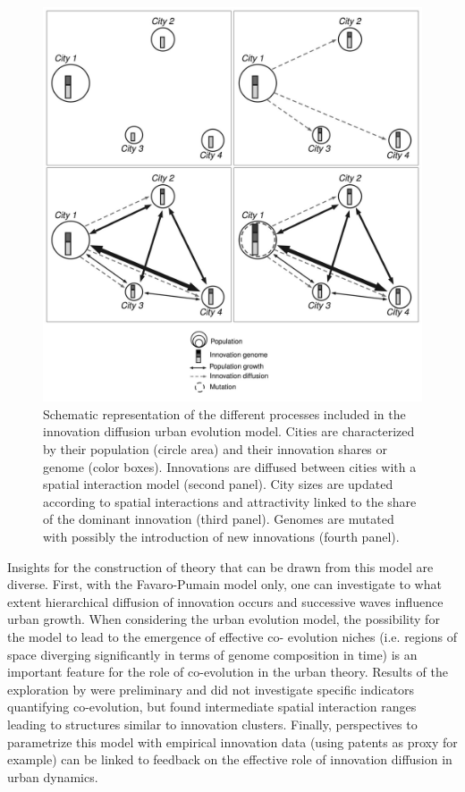 \documentclass[10pt,letterpaper]{article}
\begin{document}
\begin{figure}
	\includegraphics[width=\linewidth]{Fig2.jpg}	
	\caption{Schematic representation of the different processes included in the innovation diffusion urban evolution model. Cities are characterized by their population (circle area) and their innovation shares or genome (color boxes). Innovations are diffused between cities with a spatial interaction model (second panel). City sizes are updated according to spatial interactions and attractivity linked to the share of the dominant innovation (third panel). Genomes are mutated with possibly the introduction of new innovations (fourth panel).\label{fig:fig2}}
\end{figure}


Insights for the construction of theory that can be drawn from this model are diverse. First, with the Favaro-Pumain model only, one can investigate to what extent hierarchical diffusion of innovation occurs and successive waves influence urban growth. When considering the urban evolution model, the possibility for the model to lead to the emergence of effective co- evolution niches (i.e. regions of space diverging significantly in terms of genome composition in time) is an important feature for the role of co-evolution in the urban theory. Results of the exploration by \citep{raimbault2020model} were preliminary and did not investigate specific indicators quantifying co-evolution, but found intermediate spatial interaction ranges leading to structures similar to innovation clusters. Finally, perspectives to parametrize this model with empirical innovation data (using patents as proxy for example) can be linked to feedback on the effective role of innovation diffusion in urban dynamics.
\end{document}
